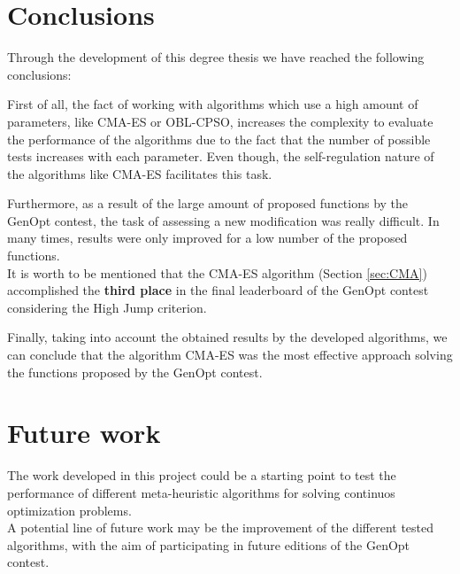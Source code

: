 
\section{Conclusions}

Through the development of this degree thesis we have reached the following conclusions: 

First of all, the fact of working with algorithms which use a high amount of parameters, like CMA-ES or OBL-CPSO, increases the complexity to evaluate the performance of the algorithms due to the fact that the number of possible tests increases with each parameter. Even though, the self-regulation nature of the algorithms like CMA-ES facilitates this task.

Furthermore, as a result of the large amount of proposed functions by the GenOpt contest, the task of assessing a new modification was really difficult. In many times, results were only improved for a low number of the proposed functions. \\

It is worth to be mentioned that the CMA-ES algorithm (Section \ref{sec:CMA}) accomplished the \textbf{third place} in the final leaderboard of the GenOpt contest considering the High Jump criterion.

Finally, taking into account the obtained results by the developed algorithms, we can conclude that the algorithm CMA-ES was the most effective approach solving the functions proposed by the GenOpt contest.



\section{Future work}

The work developed in this project could be a starting point to test the performance of different meta-heuristic algorithms for solving continuos optimization problems.\\

A potential line of future work may be the improvement of the different tested algorithms, with the aim of participating in future editions of the GenOpt contest.
